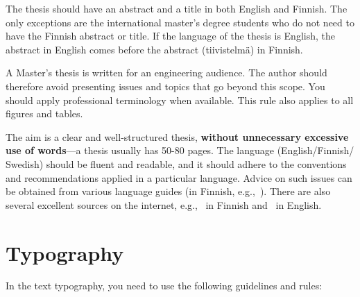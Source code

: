 The thesis should have an abstract and a title in both English and
Finnish. The only exceptions are the international master’s degree
students who do not need to have the Finnish abstract or title. If
the language of the thesis is English, the abstract in English comes
before the abstract (tiivistelmä) in Finnish.

A Master’s thesis is written for an engineering audience. The author
should therefore avoid presenting issues and topics that go beyond
this scope. You should apply professional terminology when available.
This rule also applies to all figures and tables.

The aim is a clear and well-structured thesis, \textbf{without
unnecessary excessive use of words}---a thesis usually has 50-80
pages. The language (English/Finnish/ Swedish) should be fluent and
readable, and it should adhere to the conventions and recommendations
applied in a particular language. Advice on such issues can be
obtained from various language guides (in Finnish,
e.g.,~\cite{maamies}). There are also several excellent sources on
the internet, e.g.,~\cite{korpela, kielitoimisto} in Finnish
and~\cite{reportwriting, englishlanguage} in English.

\section{Typography}

In the text typography, you need to use the following guidelines and rules:

